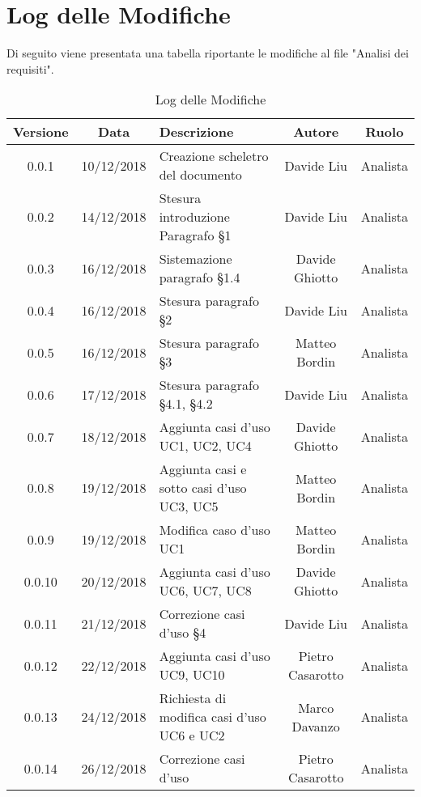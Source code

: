 \section{Log delle Modifiche}
Di seguito viene presentata una tabella riportante le modifiche al file "Analisi dei requisiti".

\begin{table}[!h] %
            \centering
            \begin{tabular}{|c|c|p{5cm}|c|c|} %
                \rowcolor{orange!50} %
        		\hline
        		\textbf{Versione} & \textbf{Data} & \textbf{Descrizione} & \textbf{Autore} & \textbf{Ruolo} \\
                \hline
                0.0.1 & 10/12/2018 & Creazione scheletro del documento & Davide Liu & Analista \\
                \hline
                0.0.2 & 14/12/2018 & Stesura introduzione Paragrafo §1 & Davide Liu & Analista \\
                \hline
                0.0.3 & 16/12/2018 & Sistemazione  paragrafo §1.4 & Davide Ghiotto & Analista \\
                \hline
                0.0.4 & 16/12/2018 & Stesura paragrafo §2 & Davide Liu & Analista \\
                \hline
                0.0.5 & 16/12/2018 & Stesura paragrafo §3 & Matteo Bordin & Analista \\
                \hline
                0.0.6 & 17/12/2018 & Stesura paragrafo §4.1, §4.2 & Davide Liu & Analista \\
                \hline
                0.0.7 & 18/12/2018 & Aggiunta casi d’uso UC1, UC2, UC4 & Davide Ghiotto & Analista \\
                \hline
                0.0.8 & 19/12/2018 & Aggiunta casi e sotto casi d’uso UC3, UC5 & Matteo Bordin & Analista \\
                \hline
                0.0.9 & 19/12/2018 & Modifica caso d’uso UC1 & Matteo Bordin & Analista \\
                \hline
                0.0.10 & 20/12/2018 & Aggiunta casi d’uso UC6, UC7, UC8 & Davide Ghiotto & Analista \\
                \hline
                0.0.11 & 21/12/2018 & Correzione casi d’uso §4 & Davide Liu & Analista \\
                \hline
                0.0.12 & 22/12/2018 & Aggiunta casi d’uso UC9, UC10 & Pietro Casarotto & Analista \\
                \hline
                0.0.13 & 24/12/2018 & Richiesta di modifica casi d’uso UC6 e UC2 & Marco Davanzo & Analista \\
                \hline
                0.0.14 & 26/12/2018 & Correzione casi d’uso & Pietro Casarotto & Analista \\
                \hline
        \end{tabular}
        \caption{Log delle Modifiche} %
        \label{tab:Log delle modifiche}
\end{table}

